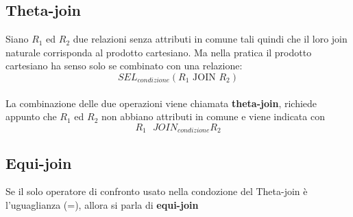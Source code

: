 \subsection{Theta-join}
Siano $R_1$ ed $R_2$ due relazioni senza attributi in comune tali quindi che il loro join naturale corrisponda al prodotto 
cartesiano. Ma nella pratica il prodotto cartesiano ha senso solo se combinato con una relazione:\\
$$SEL_{condizione}(R_1 \text{ JOIN } R_2)$$\\
La combinazione delle due operazioni viene chiamata \textbf{theta-join}, richiede appunto che $R_1$ ed $R_2$ non abbiano attributi in comune e viene indicata con\\
$$R_1 \text{ }JOIN_{condizione} R_2$$
\subsection{Equi-join}
Se il solo operatore di confronto usato nella condozione del Theta-join è l'uguaglianza (=), allora si parla di \textbf{equi-join}

